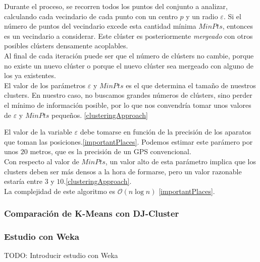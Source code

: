 \documentclass[a4paper, 12pt]{article}
\begin{document}
Durante el proceso, se recorren todos los puntos del conjunto a analizar, calculando cada vecindario de cada punto con un centro $p$ y un radio $\varepsilon$. Si el n\'umero de puntos del vecindario excede esta cantidad m\'inima $MinPts$, entonces es un vecindario a considerar. Este cl\'uster es posteriormente \textit{mergeado} con otros posibles cl\'usters densamente acoplables. \\

Al final de cada iteraci\'on puede ser que el n\'umero de cl\'usters no cambie, porque no existe un nuevo cl\'uster o porque el nuevo cl\'uster sea mergeado con alguno de los ya existentes.\\


El valor de los par\'ametros $\varepsilon$ y $MinPts$ es el que determina el tama\~no de nuestros clusters. En nuestro caso, no buscamos grandes n\'umeros de cl\'usters, sino perder el m\'inimo de informaci\'on posible, por lo que nos convendr\'ia tomar unos valores de $\varepsilon$ y $MinPts$ peque\~nos. \ref{clusteringApproach}

El valor de la variable $\varepsilon$ debe tomarse en funci\'on de la precisi\'on de los aparatos que toman las posiciones.\ref{importantPlaces}. Podemos estimar este par\'amero por unos $20$ metros, que es la precisi\'on de un GPS convencional. \\

Con respecto al valor de $MinPts$, un valor alto de esta par\'ametro implica que los clusters deben ser m\'as densos a la hora de formarse, pero un valor razonable estar\'ia entre $3$ y $10$.\ref{clusteringApproach}.\\

La complejidad de este algoritmo es $\mathcal{O}(n\log{}n)$ \ref{importantPlaces}. \\



\subsubsection{Comparaci\'on de K-Means con DJ-Cluster}

\subsubsection{Estudio con Weka}

TODO: Introducir estudio con Weka
 
\end{document}
